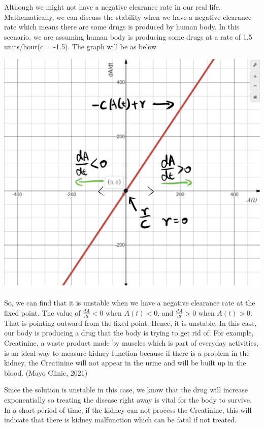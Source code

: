 \documentclass{article}
\begin{document}
Although we might not have a negative clearance rate in our real life. Mathematically, we can discuss the stability when we have a negative clearance rate which means there are some drugs is produced by human body. In this scenario, we are assuming human body is producing some drugs at a rate of 1.5 units/hour(c = -1.5). The graph will be as below\\
\begin{center}
    \includegraphics[scale = 0.15]{negtiveStab.jpg}
\end{center}
So, we can find that it is unstable when we have a negative clearance rate at the fixed point. The value of $\frac{dA}{dt} < 0$ when $A(t) < 0$, and  $\frac{dA}{dt} > 0$ when $A(t) > 0$. That is pointing outward from the fixed point. Hence, it is unstable. In this case, our body is producing a drug that the body is trying to get rid of. For example, Creatinine, a waste product made by muscles which is part of everyday activities, is an ideal way to measure kidney function because if there is a problem in the kidney, the Creatinine will not appear in the urine and will be built up in the blood. (Mayo Clinic, 2021)

Since the solution is unstable in this case, we know that the drug will increase exponentially so treating the disease right away is vital for the body to survive. In a short period of time, if the kidney can not process the Creatinine, this will indicate that there is kidney malfunction which can be fatal if not treated. 
\end{document}
